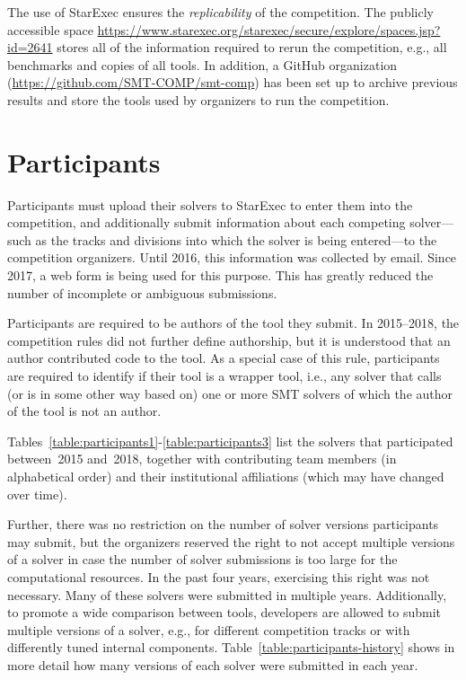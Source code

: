 \documentclass[dvipsnames,table,twoside,11pt]{article}
\begin{document}
The use of StarExec ensures the \emph{replicability} of the competition. The publicly accessible space \url{https://www.starexec.org/starexec/secure/explore/spaces.jsp?id=2641} stores all of the information required to rerun the competition, e.g., all benchmarks and copies of all tools. In addition, a GitHub organization (\url{https://github.com/SMT-COMP/smt-comp}) has been set up to archive previous results and store the tools used by organizers to run the competition.


\section{Participants}
\label{sec:participants}

Participants must upload their solvers to StarExec to enter them into
the competition, and additionally submit information about each
competing solver---such as the tracks and divisions into which the
solver is being entered---to the competition organizers.  Until 2016,
this information was collected by email.  Since 2017, a web form is
being used for this purpose.  This has greatly reduced the number of
incomplete or ambiguous submissions.

Participants are required to be authors of the tool they submit.
In 2015--2018, the competition rules did not further define authorship,
but it is understood that an author contributed code to the tool.
As a special case of this rule, participants are required to identify
if their tool is a wrapper tool, i.e., any solver that calls (or is in some
other way based on) one or more SMT solvers of which the author of the tool
is not an author.

Tables~\ref{table:participants1}-\ref{table:participants3} list the solvers
that participated between~2015 and~2018, together with contributing team
members (in alphabetical order) and their institutional affiliations (which may
have changed over time).

Further, there was no restriction on the number of solver versions participants
may submit, but the organizers reserved the right to not accept multiple
versions of a solver in case the number of solver submissions is too large for
the computational resources. In the past four years, exercising this right was
not necessary.
%
Many of these solvers were submitted in multiple years.  Additionally,
to promote a wide comparison between tools, developers are allowed to
submit multiple versions of a solver, e.g., for different competition
tracks or with differently tuned internal components.
Table~\ref{table:participants-history} shows in more detail how many
versions of each solver were submitted in each year.
\end{document}
